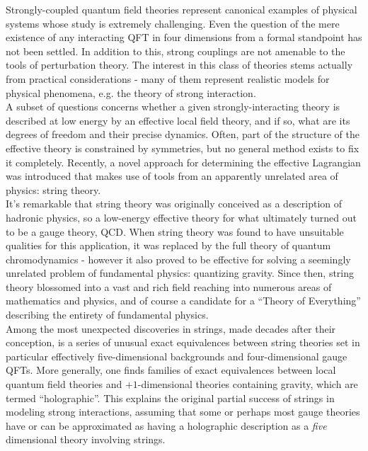 Strongly-coupled quantum field theories represent canonical examples of physical systems whose study is extremely challenging. Even the question of the mere existence of any interacting QFT in four dimensions from a formal standpoint has not been settled. In addition to this, strong couplings are not amenable to the tools of perturbation theory. The interest in this class of theories stems actually from practical considerations - many of them represent realistic models for physical phenomena, e.g. the theory of strong interaction.\\

A subset of questions concerns whether a given strongly-interacting theory is described at low energy by an effective local field theory, and if so, what are its degrees of freedom and their precise dynamics. Often, part of the structure of the effective theory is constrained by symmetries, but no general method exists to fix it completely. Recently\cite{MZ}, a novel approach for determining the effective Lagrangian was introduced that makes use of tools from an apparently unrelated area of physics: string theory.\\

It's remarkable that string theory was originally conceived as a description of hadronic physics, so a low-energy effective theory for what ultimately turned out to be a gauge theory, QCD. When string theory was found to have unsuitable qualities for this application, it was replaced by the full theory of quantum chromodynamics - however it also proved to be effective for solving a seemingly unrelated problem of fundamental physics: quantizing gravity. Since then, string theory blossomed into a vast and rich field reaching into numerous areas of mathematics and physics, and of course a candidate for a ``Theory of Everything'' describing the entirety of fundamental physics.\\


Among the most unexpected discoveries in strings, made decades after their conception, is a series of unusual exact equivalences between string theories set in particular effectively five-dimensional backgrounds and four-dimensional gauge QFTs. More generally, one finds families of exact equivalences between local quantum field theories and $+1$-dimensional theories containing gravity, which are termed ``holographic''. This explains the original partial success of strings in modeling strong interactions, assuming that some or perhaps most gauge theories have or can be approximated as having a holographic description as a \emph{five} dimensional theory involving strings.\\

